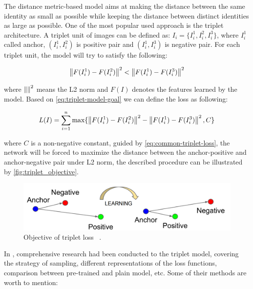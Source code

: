 The distance metric-based model aims at making the distance between the same 
identity as small as possible while keeping the distance between distinct 
identities as large as possible. 
One of the most popular used approach is the triplet architecture.
A triplet unit of images can be defined as:
$I_i=\{I_i^1, I_i^2, I_i^3\}$,
where $I_i^1$ called anchor, $(I_i^1, I_i^2)$ is positive pair and $(I_i^1, I_i^3)$ is negative pair.
For each triplet unit, the model will try to satisfy the following:

\begin{equation}
    \label{eq:triplet-model-goal}
    \left\lVert F(I_i^1) - F(I_i^2)\right\rVert ^2 < \left\lVert F(I_i^1) - F(I_i^3)\right\rVert ^2
\end{equation}

\noindent where $\left\lVert\right\rVert^2$ means the L2 norm and $F(I)$ denotes the features 
learned by the model. Based on \autoref{eq:triplet-model-goal}
we can define the loss as following:

\begin{equation}
    \label{eq:common-triplet-loss}
    L(I) = \sum_{i=1}^{n} \max\{ \left\lVert F(I_i^1) - F(I_i^2)\right\rVert ^2 - \left\lVert F(I_i^1) - F(I_i^3)\right\rVert ^2, C \}
\end{equation}

\noindent where $C$ is a non-negative constant, guided by 
\autoref{eq:common-triplet-loss}, the network will be forced to maximize the 
distance between the anchor-positive and anchor-negative pair under L2 norm, 
the described procedure can be illustrated by \autoref{fig:triplet_objective}.

\begin{figure}
    \includegraphics[width=\linewidth]{figures/triplet_objective.png}
    \caption{Objective of triplet loss ~\protect \cite{facenet-triplet-model}.}
    \label{fig:triplet_objective}
\end{figure}

In \cite{in-defense-of-triplet-loss-for-reid-2017}, comprehensive research had 
been conducted to the triplet model, covering the
strategy of sampling, different representations of the loss functions, 
comparison between pre-trained and plain model, etc. Some of their
methods are worth to mention:\\

